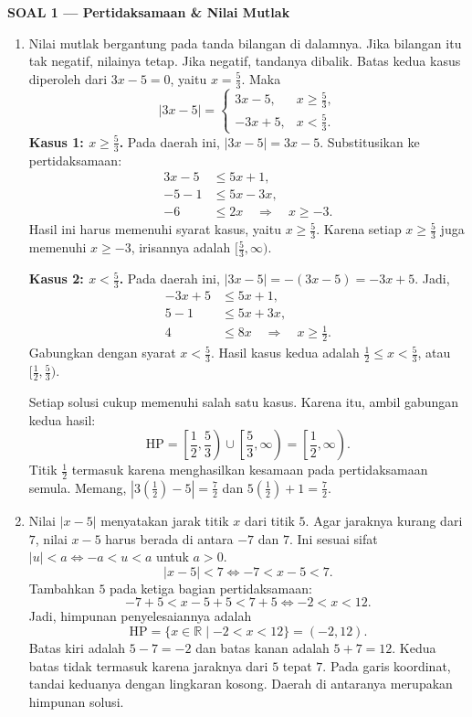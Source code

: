 \documentclass[11pt,a4paper]{article}
\newcommand{\judulsolusi}[2]{%
  \par\bigskip\textbf{SOAL #1 --- #2}\par\smallskip}
\begin{document}
\judulsolusi{1}{Pertidaksamaan \& Nilai Mutlak}
\begin{enumerate}
  \item Nilai mutlak bergantung pada tanda bilangan di dalamnya.
        Jika bilangan itu tak negatif, nilainya tetap.
        Jika negatif, tandanya dibalik.
        Batas kedua kasus diperoleh dari $3x-5=0$, yaitu $x=\frac53$.
        Maka
        \[
          |3x-5|=
          \begin{cases}
            3x-5,  & x\ge\frac53, \\
            -3x+5, & x<\frac53.
          \end{cases}
        \]
        \textbf{Kasus 1: $x\ge\frac53$.}
        Pada daerah ini, $|3x-5|=3x-5$.
        Substitusikan ke pertidaksamaan:
        \begin{align*}
          3x-5 & \le5x+1,                               \\
          -5-1 & \le5x-3x,                              \\
          -6   & \le2x\quad\Longrightarrow\quad x\ge-3.
        \end{align*}
        Hasil ini harus memenuhi syarat kasus, yaitu $x\ge\frac53$.
        Karena setiap $x\ge\frac53$ juga memenuhi $x\ge-3$, irisannya adalah
        $[\frac53,\infty)$.

        \textbf{Kasus 2: $x<\frac53$.}
        Pada daerah ini, $|3x-5|=-(3x-5)=-3x+5$.
        Jadi,
        \begin{align*}
          -3x+5 & \le5x+1,                                    \\
          5-1   & \le5x+3x,                                   \\
          4     & \le8x\quad\Longrightarrow\quad x\ge\frac12.
        \end{align*}
        Gabungkan dengan syarat $x<\frac53$.
        Hasil kasus kedua adalah $\frac12\le x<\frac53$, atau $[\frac12,\frac53)$.

        Setiap solusi cukup memenuhi salah satu kasus.
        Karena itu, ambil gabungan kedua hasil:
        \[
          \boxed{\mathrm{HP}=\left[\frac12,\frac53\right)
          \cup\left[\frac53,\infty\right)
          =\left[\frac12,\infty\right)}.
        \]
        Titik $\frac12$ termasuk karena menghasilkan kesamaan pada pertidaksamaan semula.
        Memang, $|3(\frac12)-5|=\frac72$ dan $5(\frac12)+1=\frac72$.

  \item Nilai $|x-5|$ menyatakan jarak titik $x$ dari titik $5$.
        Agar jaraknya kurang dari $7$, nilai $x-5$ harus berada di antara $-7$ dan $7$.
        Ini sesuai sifat $|u|<a\iff-a<u<a$ untuk $a>0$.
        \[
          |x-5|<7\iff-7<x-5<7.
        \]
        Tambahkan $5$ pada ketiga bagian pertidaksamaan:
        \[
          -7+5<x-5+5<7+5\iff-2<x<12.
        \]
        Jadi, himpunan penyelesaiannya adalah
        \[
          \boxed{\mathrm{HP}=\{x\in\mathbb{R}\mid-2<x<12\}=(-2,12)}.
        \]
        Batas kiri adalah $5-7=-2$ dan batas kanan adalah $5+7=12$.
        Kedua batas tidak termasuk karena jaraknya dari $5$ tepat $7$.
        Pada garis koordinat, tandai keduanya dengan lingkaran kosong.
        Daerah di antaranya merupakan himpunan solusi.


\end{enumerate}
\end{document}
